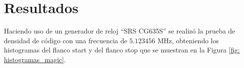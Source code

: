 \section{Resultados}
Haciendo uso de un generador de reloj ``SRS CG635S'' se realizó la prueba de densidad de código
con una frecuencia de $5.123456$ MHz, obteniendo los histogramas 
del flanco start y del flanco stop que se muestran en la Figura \ref{fig: histogramas_magic}.
\begin{figure}[H]
     \centering
     \begin{subfigure}{0.45\textwidth}
           \centering
     \end{subfigure}%
     \hspace{10pt}%
     \begin{subfigure}{0.45\textwidth}
           \centering
\end{subfigure}
\end{figure}
